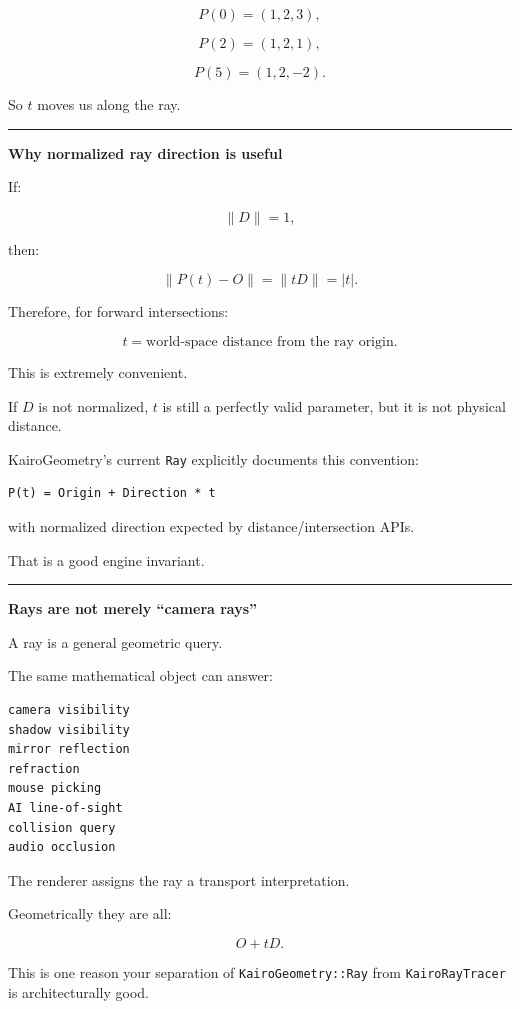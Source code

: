 \[
P(0)=(1,2,3),
\]

\[
P(2)=(1,2,1),
\]

\[
P(5)=(1,2,-2).
\]

So \(t\) moves us along the ray.

\begin{center}\rule{0.5\linewidth}{0.5pt}\end{center}

\textbf{Why normalized ray direction is useful}

If:

\[
\|D\|=1,
\]

then:

\[
\|P(t)-O\|
=
\|tD\|
=
|t|.
\]

Therefore, for forward intersections:

\[
\boxed{t=\text{world-space distance from the ray origin}.}
\]

This is extremely convenient.

If \(D\) is not normalized, \(t\) is still a perfectly valid parameter, but it is not physical distance.

KairoGeometry's current \texttt{Ray} explicitly documents this convention:

\begin{verbatim}
P(t) = Origin + Direction * t
\end{verbatim}

with normalized direction expected by distance/intersection APIs.

That is a good engine invariant.

\begin{center}\rule{0.5\linewidth}{0.5pt}\end{center}

\textbf{Rays are not merely ``camera rays''}

A ray is a general geometric query.

The same mathematical object can answer:

\begin{verbatim}
camera visibility
shadow visibility
mirror reflection
refraction
mouse picking
AI line-of-sight
collision query
audio occlusion
\end{verbatim}

The renderer assigns the ray a transport interpretation.

Geometrically they are all:

\[
O+tD.
\]

This is one reason your separation of \texttt{KairoGeometry::Ray} from \texttt{KairoRayTracer} is architecturally good.


